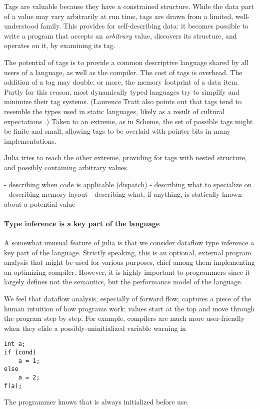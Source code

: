 Tags are valuable because they have a constrained structure. While the data
part of a value may vary arbitrarily at run time, tags are drawn from a limited,
well-understood family. This provides for self-describing data: it becomes possible
to write a program that accepts an \emph{arbitrary} value, discovers its structure,
and operates on it, by examining its tag.

The potential of tags is to provide a common descriptive language shared by all users
of a language, as well as the compiler. The cost of tags is overhead. The addition of
a tag may double, or more, the memory footprint of a data item. Partly for this reason,
most dynamically typed languages try to simplify and minimize their tag systems.
(Laurence Tratt also points out that tags tend to resemble the types used in static
languages, likely as a result of cultural expectations \cite{}.) Taken to an extreme,
as in Scheme, the set of possible tags might be finite and small, allowing tags to be
overlaid with pointer bits in many implementations.

Julia tries to reach the other extreme, providing for tags with nested structure, and
possibly containing arbitrary values.

- describing when code is applicable (dispatch)
- describing what to specialize on
- describing memory layout
- describing what, if anything, is statically known about a potential value

\paragraph{Type inference is a key part of the language}
A somewhat unusual feature of julia is that we consider dataflow type inference a
key part of the language. Strictly speaking, this is an optional, external program
analysis that might be used for various purposes, chief among them implementing
an optimizing compiler. However, it is highly important to programmers since it
largely defines not the semantics, but the performance model of the language.

We feel that dataflow analysis, especially of forward flow, captures a piece of
the human intuition of how programs work: values start at the top and move through
the program step by step. For example, compilers are much more user-friendly
when they elide a possibly-uninitialized variable warning in

\begin{verbatim}
int a;
if (cond)
    a = 1;
else
    a = 2;
f(a);
\end{verbatim}

The programmer knows that  is always initialized before use.
